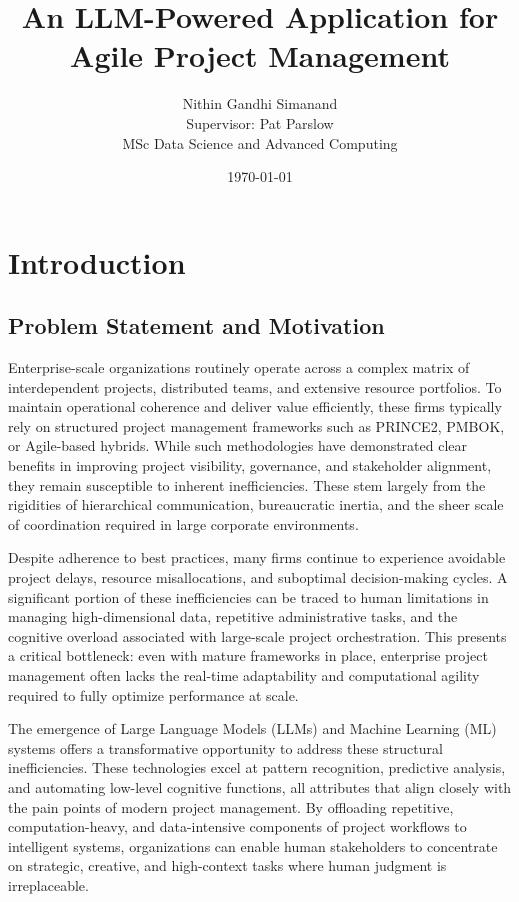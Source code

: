 \documentclass[12pt,a4paper]{report}
\title{\textbf{An LLM-Powered Application for Agile Project Management}}
\author{Nithin Gandhi Simanand \\ Supervisor: Pat Parslow \\ MSc Data Science and Advanced Computing}
\date{\today}
\begin{document}
\maketitle

\tableofcontents
\newpage

\chapter{Introduction}  %
\section{Problem Statement and Motivation}
Enterprise-scale organizations routinely operate across a complex matrix of interdependent projects, distributed teams, and extensive resource portfolios. To maintain operational coherence and deliver value efficiently, these firms typically rely on structured project management frameworks such as PRINCE2, PMBOK, or Agile-based hybrids. While such methodologies have demonstrated clear benefits in improving project visibility, governance, and stakeholder alignment, they remain susceptible to inherent inefficiencies. These stem largely from the rigidities of hierarchical communication, bureaucratic inertia, and the sheer scale of coordination required in large corporate environments.

Despite adherence to best practices, many firms continue to experience avoidable project delays, resource misallocations, and suboptimal decision-making cycles. A significant portion of these inefficiencies can be traced to human limitations in managing high-dimensional data, repetitive administrative tasks, and the cognitive overload associated with large-scale project orchestration. This presents a critical bottleneck: even with mature frameworks in place, enterprise project management often lacks the real-time adaptability and computational agility required to fully optimize performance at scale.

The emergence of Large Language Models (LLMs) and Machine Learning (ML) systems offers a transformative opportunity to address these structural inefficiencies. These technologies excel at pattern recognition, predictive analysis, and automating low-level cognitive functions, all attributes that align closely with the pain points of modern project management. By offloading repetitive, computation-heavy, and data-intensive components of project workflows to intelligent systems, organizations can enable human stakeholders to concentrate on strategic, creative, and high-context tasks where human judgment is irreplaceable.
\end{document}
